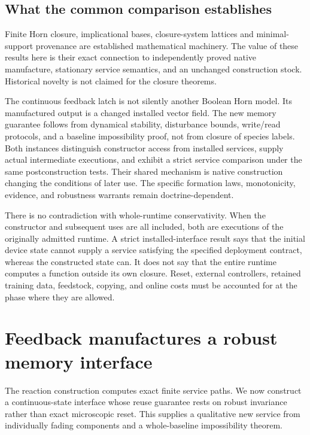 \documentclass[11pt]{article}
\theoremstyle{definition}
\theoremstyle{remark}
\begin{document}
\subsection{What the common comparison establishes}

Finite Horn closure, implicational bases, closure-system lattices and
minimal-support provenance are established mathematical machinery.
The value of these results here is their exact connection to independently
proved native manufacture, stationary service semantics, and an unchanged
construction stock. Historical novelty is not claimed for the closure
theorems.

The continuous feedback latch is not silently another Boolean Horn model.
Its manufactured output is a changed installed vector field. The new
memory guarantee follows from dynamical stability, disturbance bounds,
write/read protocols, and a baseline impossibility proof, not from
closure of species labels. Both instances distinguish constructor access
from installed services, supply actual intermediate executions, and
exhibit a strict service comparison under the same postconstruction
tests. Their shared mechanism is native construction changing the
conditions of later use. The specific formation laws, monotonicity,
evidence, and robustness warrants remain doctrine-dependent.

There is no contradiction with whole-runtime conservativity. When the
constructor and subsequent uses are all included, both are executions of
the originally admitted runtime. A strict installed-interface result says
that the initial device state cannot supply a service satisfying the
specified deployment contract, whereas the constructed state can. It
does not say that the entire runtime computes a function outside its own
closure. Reset, external controllers, retained training data, feedstock,
copying, and online costs must be accounted for at the phase where they
are allowed.


\section{Feedback manufactures a robust memory interface}
\label{sec:feedback}
The reaction construction computes exact finite service paths. We now
construct a continuous-state interface whose reuse guarantee rests on
robust invariance rather than exact microscopic reset. This supplies a
qualitative new service from individually fading components and a
whole-baseline impossibility theorem.
\end{document}
